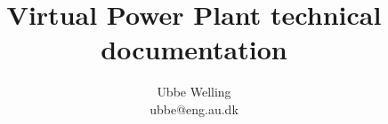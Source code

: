 \documentclass{report}
\begin{document}
\title{Virtual Power Plant technical documentation}
\author{Ubbe Welling\\ubbe@eng.au.dk}

\maketitle

\setcounter{tocdepth}{1}
\tableofcontents








\end{document}
